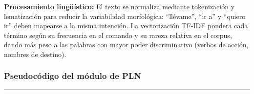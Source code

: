 \textbf{Procesamiento lingüístico:}
El texto se normaliza mediante tokenización y lematización para reducir la variabilidad
morfológica: ``llévame'', ``ir a'' y ``quiero ir'' deben mapearse a la misma intención.
La vectorización TF-IDF pondera cada término según su frecuencia en el comando y su
rareza relativa en el corpus, dando más peso a las palabras con mayor poder
discriminativo (verbos de acción, nombres de destino).

\subsubsection{Pseudocódigo del módulo de PLN}

\begin{center}
\label{alg:pln}
\end{center}
\vspace{-1.8cm}
\rule{\textwidth}{0.4pt}
\vspace{-0.9cm}

